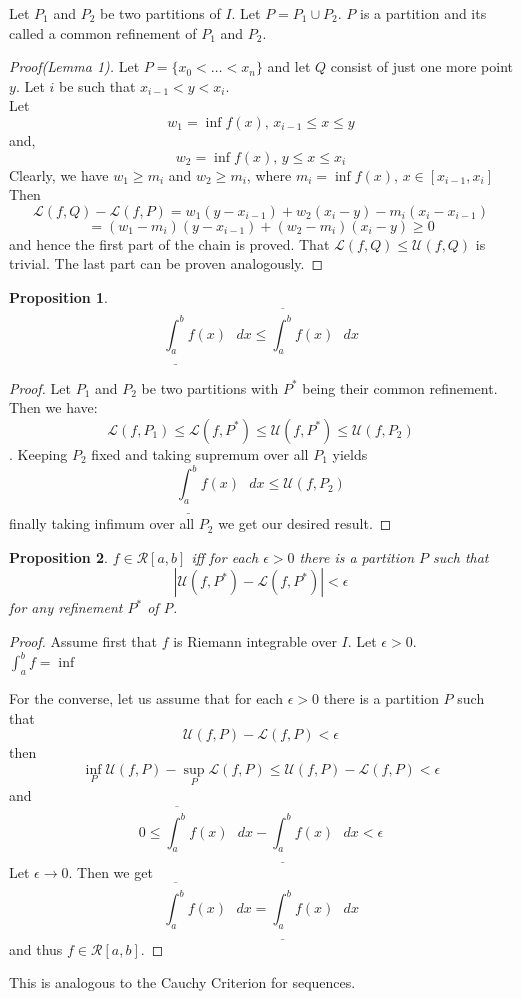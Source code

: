 \documentclass{article}
\newtheorem{proposition}{Proposition}
\begin{document}
Let $P_1$ and $P_2$ be two partitions of $I$. Let $P=P_1 \cup P_2$. $P$ is a partition and its called a common refinement of $P_1$ and $P_2$.
\begin{proof}[Proof(Lemma 1)]
    Let $P=\{x_0<\dots<x_n\}$ and let $Q$ consist of just one more point $y$. Let $i$ be such that $x_{i-1}<y<x_i$.
    \\Let $$w_1=\inf f(x)\text{, }x_{i-1}\leq x\leq y$$
    and,
    $$w_2=\inf f(x)\text{, }y\leq x\leq x_i$$
    Clearly, we have $w_1\geq m_i$ and $w_2\geq m_i$, where $m_i=\inf f(x)\text{, }x\in [x_{i-1},x_i]$
Then $$\mathcal{L}(f,Q)-\mathcal{L}(f,P)=w_1(y-x_{i-1})+w_2(x_i-y)-m_i(x_i-x_{i-1})$$
$$=(w_1-m_i)(y-x_{i-1})+(w_2-m_i)(x_i-y)\geq 0$$
and hence the first part of the chain is proved. That $\mathcal{L}(f,Q)\leq\mathcal{U}(f,Q)$ is trivial. The last part can be proven analogously.
\end{proof}
\begin{proposition}
    $$\underline{\int_a^b}f(x)\text{ }dx\leq \overline{\int_a^b}f(x)\text{ }dx$$
\end{proposition}
\begin{proof}
Let $P_1$ and $P_2$ be two partitions with $P^{*}$ being their common refinement. Then we have:
$$\mathcal{L}(f,P_1)\leq\mathcal{L}(f,P^*)\leq\mathcal{U}(f,P^*)\leq\mathcal{U}(f,P_2)$$.
Keeping $P_2$ fixed and taking supremum over all $P_1$ yields
$$\underline{\int_a^b}f(x)\text{ }dx\leq \mathcal{U}(f,P_2)$$
finally taking infimum over all $P_2$ we get our desired result.
\end{proof}
\begin{proposition}
    $f\in \mathcal{R}[a,b]$ iff for each $\epsilon>0$ there is a partition $P$ such that 
    $$|\mathcal{U}(f,P^{*})-\mathcal{L}(f,P^{*})|<\epsilon$$
    for any refinement $P^{*}$ of P.
\end{proposition}
\begin{proof}
Assume first that $f$ is Riemann integrable over $I$. Let $\epsilon>0$. \\

$\int_a^b f=\inf$







For the converse, let us assume that for each $\epsilon>0$ there is a partition $P$ such that $$\mathcal{U}(f,P)-\mathcal{L}(f,P)<\epsilon$$
then 
$$\inf_{P}\mathcal{U}(f,P)-\sup_{P}\mathcal{L}(f,P)\leq \mathcal{U}(f,P)-\mathcal{L}(f,P)<\epsilon$$
and 
$$0\leq \overline{\int_a^b}f(x)\text{ }dx-\underline{\int_a^b}f(x)\text{ }dx<\epsilon$$
Let $\epsilon\to 0$. Then we get $$\overline{\int_a^b}f(x)\text{ }dx=\underline{\int_a^b}f(x)\text{ }dx$$ and thus $f\in \mathcal{R}[a,b]$.
\end{proof}
This is analogous to the Cauchy Criterion for sequences.
\end{document}

